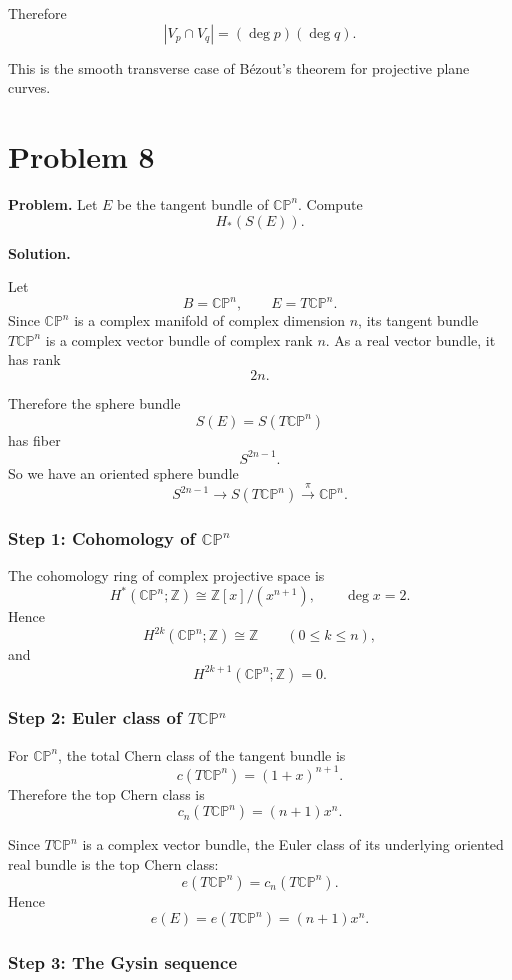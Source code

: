 \documentclass[12pt,a4paper]{article}
\theoremstyle{notespace}
\begin{document}
Therefore
\[
\boxed{
	|V_p\cap V_q|=(\deg p)(\deg q).
}
\]

This is the smooth transverse case of B\'ezout's theorem for projective plane
curves.

\section{Problem 8}

\textbf{Problem.}
Let \(E\) be the tangent bundle of \(\mathbb{CP}^n\). Compute
\[
H_*(S(E)).
\]

\medskip

\noindent\textbf{Solution.}

Let
\[
B=\mathbb{CP}^n,
\qquad
E=T\mathbb{CP}^n.
\]
Since \(\mathbb{CP}^n\) is a complex manifold of complex dimension \(n\), its
tangent bundle \(T\mathbb{CP}^n\) is a complex vector bundle of complex rank
\(n\). As a real vector bundle, it has rank
\[
2n.
\]

Therefore the sphere bundle
\[
S(E)=S(T\mathbb{CP}^n)
\]
has fiber
\[
S^{2n-1}.
\]
So we have an oriented sphere bundle
\[
S^{2n-1}
\longrightarrow
S(T\mathbb{CP}^n)
\xrightarrow{\ \pi\ }
\mathbb{CP}^n.
\]

\subsubsection*{Step 1: Cohomology of \(\mathbb{CP}^n\)}

The cohomology ring of complex projective space is
\[
H^*(\mathbb{CP}^n;\mathbb Z)
\cong
\mathbb Z[x]/(x^{n+1}),
\qquad
\deg x=2.
\]
Hence
\[
H^{2k}(\mathbb{CP}^n;\mathbb Z)\cong \mathbb Z
\qquad
(0\le k\le n),
\]
and
\[
H^{2k+1}(\mathbb{CP}^n;\mathbb Z)=0.
\]

\subsubsection*{Step 2: Euler class of \(T\mathbb{CP}^n\)}

For \(\mathbb{CP}^n\), the total Chern class of the tangent bundle is
\[
c(T\mathbb{CP}^n)=(1+x)^{n+1}.
\]
Therefore the top Chern class is
\[
c_n(T\mathbb{CP}^n)=(n+1)x^n.
\]

Since \(T\mathbb{CP}^n\) is a complex vector bundle, the Euler class of its
underlying oriented real bundle is the top Chern class:
\[
e(T\mathbb{CP}^n)=c_n(T\mathbb{CP}^n).
\]
Hence
\[
e(E)
=
e(T\mathbb{CP}^n)
=
(n+1)x^n.
\]

\subsubsection*{Step 3: The Gysin sequence}
\end{document}
